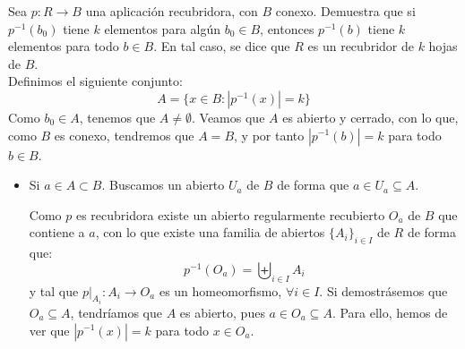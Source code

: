 \begin{ejercicio}\label{ej:k_hojas} %
    Sea $p:R\to B$ una aplicación recubridora, con $B$ conexo. Demuestra que si $p^{-1}(b_0)$ tiene $k$ elementos para algún $b_0\in B$, entonces $p^{-1}(b)$ tiene $k$ elementos para todo $b\in B$. En tal caso, se dice que $R$ es un recubridor de $k$ hojas de $B$.\\

    Definimos el siguiente conjunto:
    \begin{equation*}
        A = \{x\in B : |p^{-1}(x)|=k\}
    \end{equation*}
    Como $b_0 \in A$, tenemos que $A\neq \emptyset $. Veamos que $A$ es abierto y cerrado, con lo que, como $B$ es conexo, tendremos que $A = B$, y por tanto $|p^{-1}(b)|=k$ para todo $b\in B$.
    \begin{itemize}
        \item Si $a\in A\subset B$. Buscamos un abierto $U_a$ de $B$ de forma que $a\in U_a \subseteq A$.
        
        Como $p$ es recubridora existe un abierto regularmente recubierto $O_a$ de $B$ que contiene a $a$, con lo que existe una familia de abiertos $\{A_i\}_{i \in I}$ de $R$ de forma que:
            \begin{equation*}
                p^{-1}(O_a) = \biguplus_{i \in I}A_i
            \end{equation*}
            y tal que $p\big|_{A_i}:A_i\to O_a$ es un homeomorfismo, $\forall i \in I$. Si demostrásemos que $O_a \subseteq A$, tendríamos que $A$ es abierto, pues $a\in O_a \subseteq A$. Para ello, hemos de ver que $|p^{-1}(x)|=k$ para todo $x\in O_a$.\\
            

\end{itemize}
\end{ejercicio}
